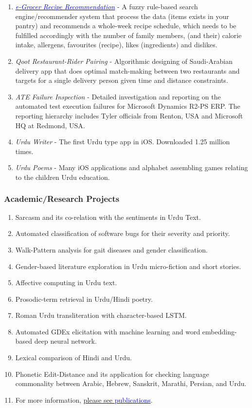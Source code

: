 \documentclass[a4paper, 10pt]{article}
\begin{document}
\begin{enumerate}
\item \emph{ \href{https://play.google.com/store/apps/details?id=com.egrocer&hl=en&gl=US}{\textcolor{blue}{e-Grocer Recipe Recommendation}}} - A fuzzy rule-based search engine/recommender system that process the data (items exists in your pantry) and recommends a whole-week recipe schedule, which needs to be fulfilled accordingly with the number of family members, (and their) calorie intake, allergens, favourites (recipe), likes (ingredients) and dislikes.

\item \emph{ Qoot Restaurant-Rider Pairing} - Algorithmic designing of Saudi-Arabian delivery app that does optimal match-making between two restaurants and targets for a single delivery person given time and distance constraints.

\item \emph{ ATE Failure Inspection} - Detailed investigation and reporting on the automated test execution failures for Microsoft Dynamics R2-PS ERP. The reporting hierarchy includes Tyler officials from Renton, USA and Microsoft HQ at Redmond, USA.

\item \emph{ Urdu Writer} - The first Urdu type app in iOS. Downloaded 1.25 million times.

\item \emph{ Urdu Poems} - Many iOS applications and alphabet assembling games relating to the children Urdu education.
\end{enumerate}
\subsubsection*{Academic/Research Projects}
\begin{enumerate}
\itemsep = 0em
\item Sarcasm and its co-relation with the sentiments in Urdu Text.
\item Automated classification of software bugs for their severity and priority.
\item Walk-Pattern analysis for gait diseases and gender classification.
\item Gender-based literature exploration in Urdu micro-fiction and short stories.
\item Affective computing in Urdu text.
\item Prosodic-term retrieval in Urdu/Hindi poetry.
\item Roman Urdu transliteration with character-based LSTM.
\item Automated GDEx elicitation with machine learning and word embedding-based deep neural network.
\item Lexical comparison of Hindi and Urdu.
\item Phonetic Edit-Distance and its application for checking language commonality between Arabic, Hebrew, Sanskrit, Marathi, Persian, and Urdu.
\item For more information, \hyperref[publications]{please see \textcolor{blue}{publications}}.
\end{enumerate}
\end{document}

